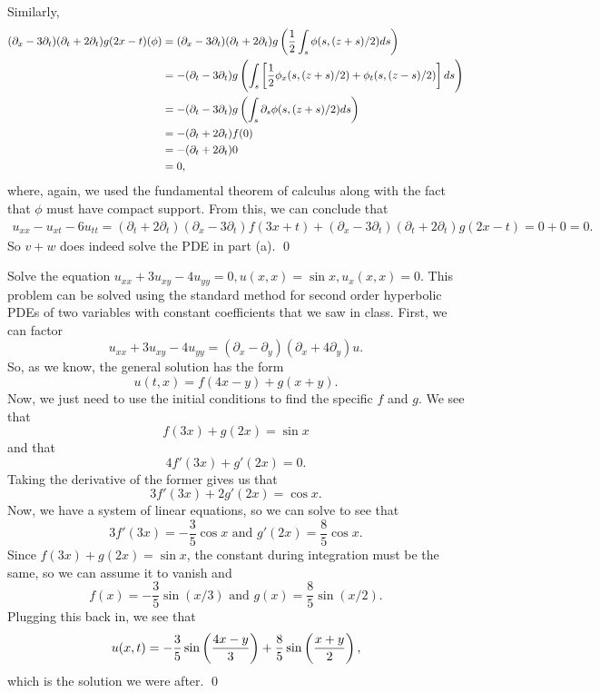 \documentclass{article}
\renewcommand{\d}{\partial}
\begin{document}
\begin{enumerate}[(a)]
    \hop 
    Similarly,
    \begin{align*}
        (\d_x - 3\d_t)(\d_t + 2\d_t)g(2x - t)(\phi) &= (\d_x - 3\d_t)(\d_t + 2\d_t)g\del{\frac{1}{2}\int_s \phi(s, (z+s)/2)ds} \\
        &=-(\d_t - 3\d_t)g\del{\int_s \sbr{\frac{1}{2}\phi_x(s, (z+s)/2) + \phi_t(s, (z-s)/2)}ds}\\
        &= -(\d_t - 3\d_t)g\del{\int_s \d_s \phi(s, (z+s)/2)ds} \\
        &= -(\d_t + 2\d_t)f(0)\\
        &= -(\d_t + 2\d_t)0\\
        &=0,
    \end{align*}
    where, again, we used the fundamental theorem of calculus along with the fact that $\phi$ must have compact support. 
    \hop 
    From this, we can conclude that 
    \begin{align*}
        u_{xx}-u_{xt}-6u_{tt} = (\d_t + 2\d_t)(\d_x - 3\d_t)f(3x + t) +  (\d_x - 3\d_t)(\d_t + 2\d_t)g(2x-t) = 0+0 = 0.
    \end{align*}
    So $v+w$ does indeed solve the PDE in part (a). \qed
\end{enumerate}


\newpage
{} Solve the equation $u_{xx} + 3u_{xy} - 4u_{yy} = 0, u(x,x) = \sin x, u_x(x,x) = 0$. \tri
\hop
\solution This problem can be solved using the standard method for second order hyperbolic PDEs of two variables with constant coefficients that we saw in class. 
\hop 
First, we can factor 
\[u_{xx} + 3u_{xy} -4u_{yy} = (\d_x - \d_y)(\d_x + 4\d_y)u.\]
So, as we know, the general solution has the form 
\[u(t,x) = f(4x - y)+ g(x+y).\]
Now, we just need to use the initial conditions to find the specific $f$ and $g$. We see that 
\[f(3x)+g(2x) = \sin x\]
and that 
\[4f'(3x) + g'(2x) = 0.\]
Taking the derivative of the former gives us that 
\[3f'(3x)+2g'(2x) = \cos x.\]
Now, we have a system of linear equations, so we can solve to see that 
\[3f'(3x) = - \frac{3}{5}\cos x \text{ and } g'(2x) = \frac{8}{5} \cos x .\]
Since $f(3x) + g(2x) = \sin x$, the constant during integration must be the same, so we can assume it to vanish and
\[f(x) = -\frac{3}{5}\sin(x/3) \text{ and } g(x) = \frac{8}{5}\sin(x/2).\]
Plugging this back in, we see that 
\[u(x,t) =  -\frac{3}{5}\sin\del{\frac{4x-y}{3}} + \frac{8}{5}\sin\del{\frac{x+y}{2}},\]
which is the solution we were after. \qed
\end{document}
